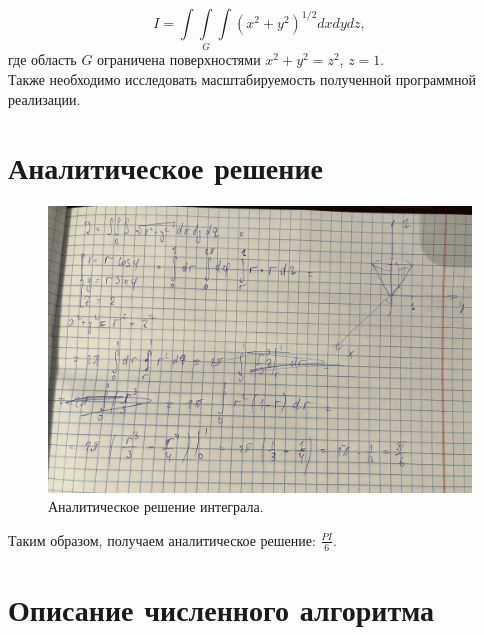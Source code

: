 \documentclass[a4paper, 12pt]{article}
\begin{document}
    \begin{equation}
        I = \int\int\limits_{G}\int {{(x^2 + y^2)}^{1/2}{dxdydz}},
    \end{equation}
    где область $G$ ограничена поверхностями $x^2 + y^2 = z^2$, $z = 1$.\\
    
    Также необходимо исследовать масштабируемость полученной программной реализации.
\section{Аналитическое решение}
\newpage
    \begin{figure}
    \centering
    \includegraphics[width=1\textwidth]{1.jpg}
    \caption{\label{fig:frog}Аналитическое решение интеграла.}
    \end{figure}

    Таким образом, получаем аналитическое решение: $\frac{PI}{6}$.

\section{Описание численного алгоритма}
\end{document}
